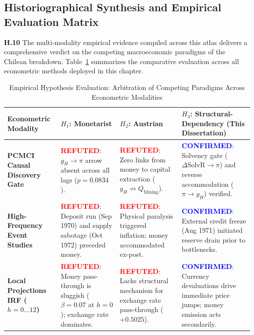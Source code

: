 \subsection{Historiographical Synthesis and Empirical Evaluation Matrix}
\label{app:scorecard_synthesis}

\textbf{H.10} The multi-modality empirical evidence compiled across this atlas delivers a comprehensive verdict on the competing macroeconomic paradigms of the Chilean breakdown. Table~\ref{tab:app_h_scorecard} summarizes the comparative evaluation across all econometric methods deployed in this chapter.

\begin{table}[htbp]
\centering
\small
\caption{Empirical Hypothesis Evaluation: Arbitration of Competing Paradigms Across Econometric Modalities}
\label{tab:app_h_scorecard}
\begin{tabularx}{\textwidth}{>{\raggedright\arraybackslash}p{3.0cm}>{\raggedright\arraybackslash}p{3.6cm}>{\raggedright\arraybackslash}p{3.6cm}>{\raggedright\arraybackslash}X}
\toprule
\textbf{Econometric Modality} & \textbf{$H_1$: Monetarist \citep{Edwards2024}} & \textbf{$H_2$: Austrian \citep{EspinosaVejar2025}} & \textbf{$H_3$: Structural-Dependency (This Dissertation)} \\
\midrule
\textbf{PCMCI Causal Discovery Gate} & \textcolor{red}{\textbf{REFUTED}}: $g_H \to \pi$ arrow absent across all lags ($p = 0.0834$). & \textcolor{red}{\textbf{REFUTED}}: Zero links from money to capital extraction ($g_H \not\to Q_{\text{Mining}}$). & \textcolor{blue}{\textbf{CONFIRMED}}: Solvency gate ($\Delta \text{SolvR} \to \pi$) and reverse accommodation ($\pi \to g_H$) verified. \\
\addlinespace[0.2em]
\textbf{High-Frequency Event Studies} & \textcolor{red}{\textbf{REFUTED}}: Deposit run (Sep 1970) and supply sabotage (Oct 1972) preceded money. & \textcolor{red}{\textbf{REFUTED}}: Physical paralysis triggered inflation; money accommodated ex-post. & \textcolor{blue}{\textbf{CONFIRMED}}: External credit freeze (Aug 1971) initiated reserve drain prior to bottlenecks. \\
\addlinespace[0.2em]
\textbf{Local Projections IRF ($h=0\dots 12$)} & \textcolor{red}{\textbf{REFUTED}}: Money pass-through is sluggish ($\beta=0.07$ at $h=0$); exchange rate dominates. & \textcolor{red}{\textbf{REFUTED}}: Lacks structural mechanism for exchange rate pass-through ($+0.5025$). & \textcolor{blue}{\textbf{CONFIRMED}}: Currency devaluations drive immediate price jumps; money emission acts secondarily. \\

\end{tabularx}
\end{table}
